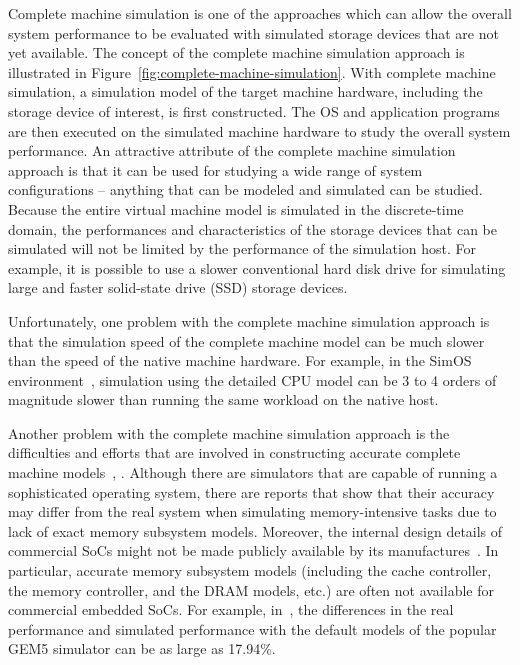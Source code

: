 Complete machine simulation is one of the approaches which can allow the overall system performance to be evaluated with simulated storage devices that are not yet available. The concept of the complete machine simulation approach is illustrated in Figure~\ref{fig:complete-machine-simulation}. With complete machine simulation, a simulation model of the target machine hardware, including the storage device of interest, is first constructed.  The OS and application programs are then executed on the simulated machine hardware to study the overall system performance. An attractive attribute of the complete machine simulation approach is that it can be used for studying a wide range of system configurations – anything that can be modeled and simulated can be studied. Because the entire virtual machine model is simulated in the discrete-time domain, the performances and characteristics of the storage devices that can be simulated will not be limited by the performance of the simulation host. For example, it is possible to use a slower conventional hard disk drive for simulating large and faster solid-state drive (SSD) storage devices.

Unfortunately, one problem with the complete machine simulation approach is that the simulation speed of the complete machine model can be much slower than the speed of the native machine hardware. For example, in the SimOS environment~\cite{Rosenblum:1995}, simulation using the detailed CPU model can be 3 to 4 orders of magnitude slower than running the same workload on the native host.

Another problem with the complete machine simulation approach is the difficulties and efforts that are involved in constructing accurate complete machine models~\cite{Gibson:2000}, \cite{Gutierrez:2014}. Although there are simulators that are capable of running a sophisticated operating system, there are reports that show that their accuracy may differ from the real system when simulating memory-intensive tasks due to lack of exact memory subsystem models. Moreover, the internal design details of commercial SoCs might not be made publicly available by its manufactures~\cite{Eklov:2011}. In particular, accurate memory subsystem models (including the cache controller, the memory controller, and the DRAM models, etc.) are often not available for commercial embedded SoCs. For example, in~\cite{Butko:2012}, the differences in the real performance and simulated performance with the default models of the popular GEM5 simulator can be as large as 17.94\%.

